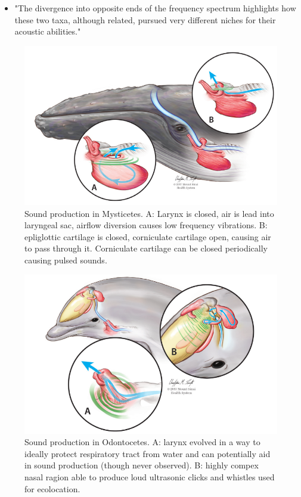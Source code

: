 \documentclass[12pt,a4paper]{article}
\begin{document}
\begin{itemize}
\begin{itemize}
\begin{itemize}
       \item the melon is a biconvex shaped organ, made up of isovaleric acid (saturated fatty acid), with similar density as seawater (small loss due to impedance change)
       \newline \indent $\longrightarrow$ the isovaleric acid or spermaceti is one of the reasons it was heavily hunted as the huge amounts of the fatty acid was used in cosmetics, lubricant, and expecially candles
       \item the shape of the melon can be altered through facial muscles, thus focusing the direction of the sound beam  
       \item see fig. \ref{fig:sound_prod_odonto}
     \end{itemize}
     \item "The divergence into opposite ends of the frequency spectrum highlights how these two taxa, although related, pursued very different niches for their acoustic abilities."
   \end{itemize}
\end{itemize}

\begin{figure}
  \centering
  \includegraphics[width=.5\linewidth]{Images/sound_prod_mysticetes.png}
  \caption[Sound production in Mysticetes.]{Sound production in Mysticetes. A: Larynx is closed, air is lead into laryngeal sac, airflow diversion causes low frequency vibrations. B: epliglottic cartilage is closed, corniculate cartilage open, causing air to pass through it. Corniculate cartilage can be closed periodically causing pulsed sounds.}
  \label{fig:sound_prod_mysticetes}
\end{figure}

\begin{figure}
  \centering
  \includegraphics[width=.5\linewidth]{Images/sound_prod_odontocetes.png} 
  \caption[Sound production in Odontocetes]{Sound production in Odontocetes. A: larynx evolved in a way to ideally protect respiratory tract from water and can potentially aid in sound production (though never observed). B: highly compex nasal ragion able to produce loud ultrasonic clicks and whistles used for ecolocation.}
  \label{fig:sound_prod_odonto}
\end{figure}
\end{document}
